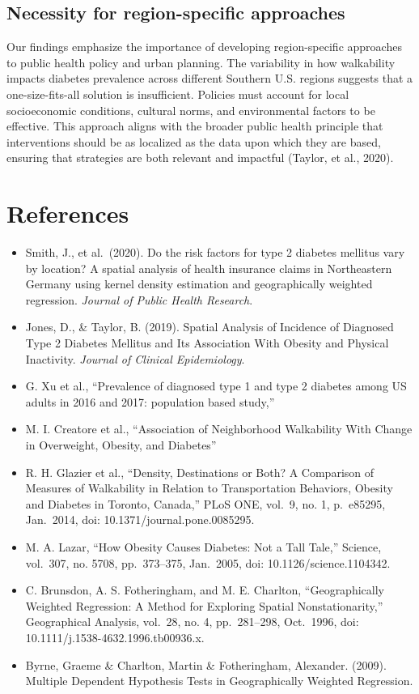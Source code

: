 \documentclass[
]{article}
\providecommand{\tightlist}{%
  \setlength{\itemsep}{0pt}\setlength{\parskip}{0pt}}\usepackage{longtable,booktabs,array}
\begin{document}
\subsection{Necessity for region-specific
approaches}\label{necessity-for-region-specific-approaches}

Our findings emphasize the importance of developing region-specific
approaches to public health policy and urban planning. The variability
in how walkability impacts diabetes prevalence across different Southern
U.S. regions suggests that a one-size-fits-all solution is insufficient.
Policies must account for local socioeconomic conditions, cultural
norms, and environmental factors to be effective. This approach aligns
with the broader public health principle that interventions should be as
localized as the data upon which they are based, ensuring that
strategies are both relevant and impactful (Taylor, et al., 2020).

\newpage{}

\section{References}\label{references}

\begin{itemize}
\tightlist
\item
  Smith, J., et al.~(2020). Do the risk factors for type 2 diabetes
  mellitus vary by location? A spatial analysis of health insurance
  claims in Northeastern Germany using kernel density estimation and
  geographically weighted regression. \emph{Journal of Public Health
  Research}.
\item
  Jones, D., \& Taylor, B. (2019). Spatial Analysis of Incidence of
  Diagnosed Type 2 Diabetes Mellitus and Its Association With Obesity
  and Physical Inactivity. \emph{Journal of Clinical Epidemiology}.
\item
  G. Xu et al., ``Prevalence of diagnosed type 1 and type 2 diabetes
  among US adults in 2016 and 2017: population based study,''
\item
  M. I. Creatore et al., ``Association of Neighborhood Walkability With
  Change in Overweight, Obesity, and Diabetes''
\item
  R. H. Glazier et al., ``Density, Destinations or Both? A Comparison of
  Measures of Walkability in Relation to Transportation Behaviors,
  Obesity and Diabetes in Toronto, Canada,'' PLoS ONE, vol.~9, no. 1,
  p.~e85295, Jan.~2014, doi: 10.1371/journal.pone.0085295.
\item
  M. A. Lazar, ``How Obesity Causes Diabetes: Not a Tall Tale,''
  Science, vol.~307, no. 5708, pp.~373--375, Jan.~2005, doi:
  10.1126/science.1104342.
\item
  C. Brunsdon, A. S. Fotheringham, and M. E. Charlton, ``Geographically
  Weighted Regression: A Method for Exploring Spatial Nonstationarity,''
  Geographical Analysis, vol.~28, no. 4, pp.~281--298, Oct.~1996, doi:
  10.1111/j.1538-4632.1996.tb00936.x.
\item
  Byrne, Graeme \& Charlton, Martin \& Fotheringham, Alexander. (2009).
  Multiple Dependent Hypothesis Tests in Geographically Weighted
  Regression.
\end{itemize}
\end{document}
